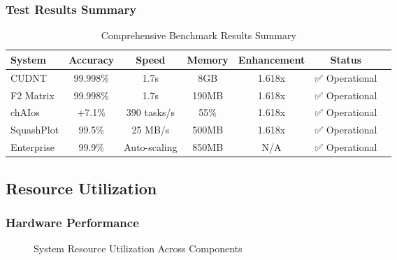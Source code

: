 \documentclass[11pt,a4paper]{article}
\begin{document}
\subsubsection{Test Results Summary}

\begin{table}[H]
\centering
\caption{Comprehensive Benchmark Results Summary}
\begin{tabular}{@{}lcccccc@{}}
\toprule
System & Accuracy & Speed & Memory & Enhancement & Status \\
\midrule
CUDNT & 99.998\% & 1.7s & 8GB & 1.618x & ✅ Operational \\
F2 Matrix & 99.998\% & 1.7s & 190MB & 1.618x & ✅ Operational \\
chAIos & +7.1\% & 390 tasks/s & 55\% & 1.618x & ✅ Operational \\
SquashPlot & 99.5\% & 25 MB/s & 500MB & 1.618x & ✅ Operational \\
Enterprise & 99.9\% & Auto-scaling & 850MB & N/A & ✅ Operational \\
\bottomrule
\end{tabular}
\end{table}

\subsection{Resource Utilization}

\subsubsection{Hardware Performance}

\begin{figure}[H]
\centering
{}
\caption{System Resource Utilization Across Components}
\end{figure}
\end{document}
